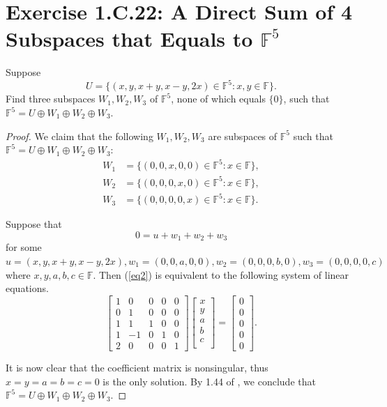 \section{Exercise 1.C.22: A Direct Sum of 4 Subspaces that Equals to $\mathbb{F}^5$}
Suppose \[
U=\{(x,y,x+y,x-y,2x)\in\mathbb{F}^5:x,y\in\mathbb{F}\}.
\]
Find three subspaces $W_1,W_2,W_3$ of $\mathbb{F}^5$, none of which equals $\{0\}$, such that $\mathbb{F}^5=U\oplus W_1\oplus W_2\oplus W_3$.
\begin{proof}
We claim that the following $W_1,W_2,W_3$ are subspaces of $\mathbb{F}^5$ such that $\mathbb{F}^5=U\oplus W_1\oplus W_2\oplus W_3$:
\begin{equation*}
\begin{split}
W_1&=\{(0,0,x,0,0)\in\mathbb{F}^5:x\in\mathbb{F}\},\\
W_2&=\{(0,0,0,x,0)\in\mathbb{F}^5:x\in\mathbb{F}\},\\
W_3&=\{(0,0,0,0,x)\in\mathbb{F}^5:x\in\mathbb{F}\}.
\end{split}
\end{equation*}

Suppose that
\begin{equation}\label{eq2}
0=u+w_1+w_2+w_3
\end{equation}
for some $u=(x,y,x+y,x-y,2x), w_1=(0,0,a,0,0), w_2=(0,0,0,b,0), w_3=(0,0,0,0,c)$ where $x,y,a,b,c\in\mathbb{F}$. Then (\ref{eq2}) is equivalent to the following system of linear equations.
\[
\begin{bmatrix}
1 &0 &0 &0 &0\\
0 &1 &0 &0 &0\\
1 &1 &1 &0 &0\\
1 &-1 &0 &1 &0\\
2 &0 &0 &0 &1
\end{bmatrix}
\begin{bmatrix}
x\\
y\\
a\\
b\\
c\\
\end{bmatrix}
=
\begin{bmatrix}
0\\
0\\
0\\
0\\
0
\end{bmatrix}.
\]

It is now clear that the coefficient matrix is nonsingular, thus $x=y=a=b=c=0$ is the only solution. By 1.44 of \cite{axler2014linear}, we conclude that $\mathbb{F}^5=U\oplus W_1\oplus W_2\oplus W_3$.
\end{proof}

